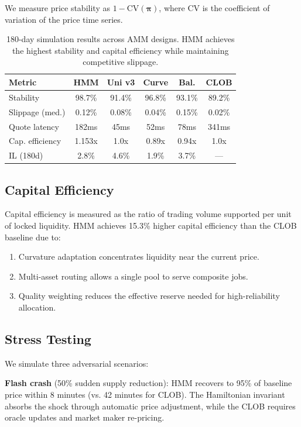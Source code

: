 \documentclass[11pt,twocolumn]{article}
\begin{document}
We measure price stability as $1 - \text{CV}(\bm{\pi})$, where $\text{CV}$ is the coefficient of variation of the price time series.

\begin{table}[H]
\centering
\small
\begin{tabular}{lccccc}
\toprule
\textbf{Metric} & \textbf{HMM} & \textbf{Uni v3} & \textbf{Curve} & \textbf{Bal.} & \textbf{CLOB} \\
\midrule
Stability & 98.7\% & 91.4\% & 96.8\% & 93.1\% & 89.2\% \\
Slippage (med.) & 0.12\% & 0.08\% & 0.04\% & 0.15\% & 0.02\% \\
Quote latency & 182ms & 45ms & 52ms & 78ms & 341ms \\
Cap. efficiency & 1.153x & 1.0x & 0.89x & 0.94x & 1.0x \\
IL (180d) & 2.8\% & 4.6\% & 1.9\% & 3.7\% & --- \\
\bottomrule
\end{tabular}
\caption{180-day simulation results across AMM designs. HMM achieves the highest stability and capital efficiency while maintaining competitive slippage.}
\label{tab:simulation}
\end{table}

\subsection{Capital Efficiency}

Capital efficiency is measured as the ratio of trading volume supported per unit of locked liquidity. HMM achieves 15.3\% higher capital efficiency than the CLOB baseline due to:
\begin{enumerate}[leftmargin=1.4em]
    \item Curvature adaptation concentrates liquidity near the current price.
    \item Multi-asset routing allows a single pool to serve composite jobs.
    \item Quality weighting reduces the effective reserve needed for high-reliability allocation.
\end{enumerate}

\subsection{Stress Testing}

We simulate three adversarial scenarios:

\textbf{Flash crash} (50\% sudden supply reduction): HMM recovers to 95\% of baseline price within 8 minutes (vs. 42 minutes for CLOB). The Hamiltonian invariant absorbs the shock through automatic price adjustment, while the CLOB requires oracle updates and market maker re-pricing.
\end{document}
